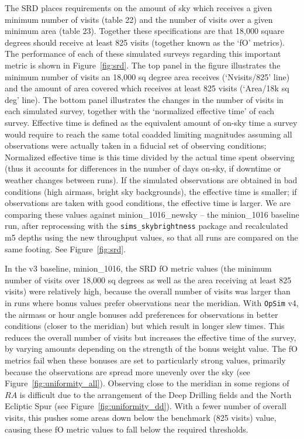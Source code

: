 \documentclass[DM,lsstdraft,authoryear,toc]{lsstdoc}
\newcommand{\opsim}{\texttt{OpSim}\xspace}
\newcommand{\simsky}{\texttt{sims\_skybrightness}\xspace}
\begin{document}
The SRD places requirements on the amount of sky which receives a given minimum number of visits (table 22) and the number of visits over a given minimum area (table 23). Together these specifications are that 18,000 square degrees should receive at least 825 visits (together known as the `fO' metrics). The performance of each of these simulated surveys regarding this important metric is shown in Figure~\ref{fig:srd}. The top panel in the figure illustrates the minimum number of visits an 18,000 sq degree area receives (`Nvisits/825' line) and the amount of area covered which receives at least 825 visits (`Area/18k sq deg' line).  The bottom panel illustrates the changes in the number of visits in each simulated survey, together with the `normalized effective time' of each survey. Effective time is defined as the equivalent amount of on-sky time a survey would require to reach the same total coadded limiting magnitudes assuming all observations were actually taken in a fiducial set of observing conditions; Normalized effective time is this time divided by the actual time spent observing (thus it accounts for differences in the number of days on-sky, if downtime or weather changes between runs). If the simulated observations are obtained in bad conditions (high airmass, bright sky backgrounds), the effective time is smaller; if observations are taken with good conditions, the effective time is larger. We are comparing these values against minion\_1016\_newsky -- the minion\_1016 baseline run, after reprocessing with the \simsky package and recalculated m5 depths using the new throughput values, so that all runs are compared on the same footing. See Figure~\ref{fig:srd}. 

In the v3 baseline, minion\_1016, the SRD fO metric values (the minimum number of visits over 18,000 sq degrees as well as the area receiving at least 825 visits) were relatively high, because the overall number of visits was larger than in runs where bonus values prefer observations near the meridian. With \opsim v4, the airmass or hour angle bonuses add preferences for observations in better conditions (closer to the meridian) but which result in longer slew times. This reduces the overall number of visits but increases the effective time of the survey, by varying amounts depending on the strength of the bonus weight value. The fO metrics fail when these bonuses are set to particularly strong values, primarily because the observations are spread more unevenly over the sky (see Figure~\ref{fig:uniformity_all}).  Observing close to the meridian in some regions of $RA$ is difficult due to the arrangement of the Deep Drilling fields and the North Ecliptic Spur (see Figure~\ref{fig:uniformity_dd}). With a fewer number of overall visits, this pushes some areas down below the benchmark (825 visits) value, causing these fO metric values to fall below the required thresholds.
\end{document}
